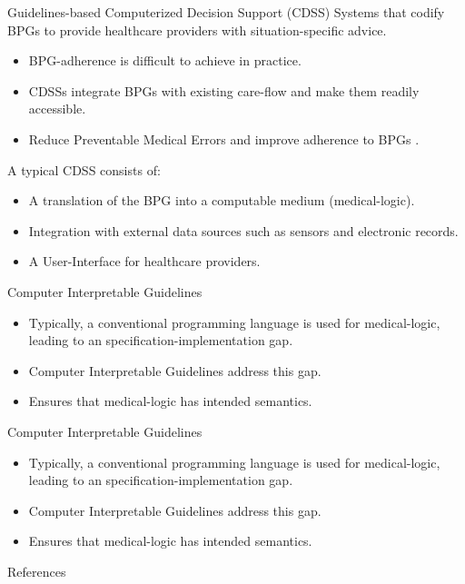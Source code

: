 \documentclass{beamer}
\begin{document}
\begin{frame}{Guidelines-based Computerized Decision Support (CDSS)}
  Systems that codify BPGs to provide healthcare providers with situation-specific advice.
  \begin{itemize}
    \item BPG-adherence is difficult to achieve in practice.
    \item CDSSs integrate BPGs with existing care-flow and make them readily
      accessible.
    \item Reduce Preventable Medical Errors \cite{GargJAMA06,KawamotoBMJ05} and improve adherence to BPGs \cite{BenettJAMIA16,SahotaJIS11}.
  \end{itemize}
  \pause
  A typical CDSS consists of:
  \begin{itemize}
    \item A translation of the BPG into a computable medium (medical-logic).
    \item Integration with external data sources such as sensors and electronic
      records.
   \item A User-Interface for healthcare providers.
  \end{itemize}
\end{frame}

\begin{frame}{Computer Interpretable Guidelines}
  \begin{itemize}
    \item Typically, a conventional programming language
      is used for medical-logic, leading to an
      \alert{specification-implementation} gap.
    \pause
    \item Computer Interpretable Guidelines address this gap.
    \item Ensures that medical-logic has intended semantics.
  \end{itemize}
\end{frame}

\begin{frame}{Computer Interpretable Guidelines}
  \begin{itemize}
    \item Typically, a conventional programming language
      is used for medical-logic, leading to an
      \alert{specification-implementation} gap.
    \pause
    \item Computer Interpretable Guidelines address this gap.
    \item Ensures that medical-logic has intended semantics.
  \end{itemize}
\end{frame}

\begin{frame}[allowframebreaks]{References}
  
\end{frame}
\end{document}
